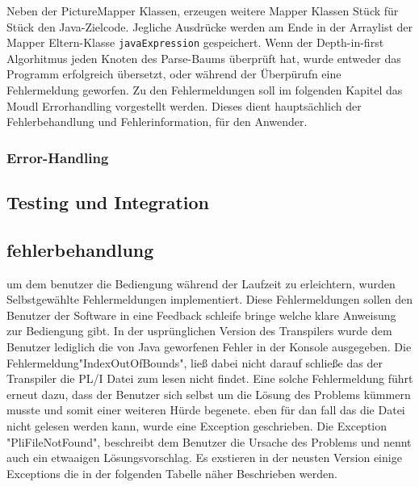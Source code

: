 Neben der PictureMapper Klassen, erzeugen weitere Mapper Klassen Stück für Stück den Java-Zielcode. 
Jegliche Ausdrücke werden am Ende in der Arraylist der Mapper Eltern-Klasse \verb+javaExpression+ gespeichert.
Wenn der Depth-in-first Algorhitmus jeden Knoten des Parse-Baums überprüft hat, wurde entweder das Programm erfolgreich übersetzt, oder während der Überpürufn 
eine Fehlermeldung geworfen.
Zu den Fehlermeldungen soll im folgenden Kapitel das Moudl Errorhandling vorgestellt werden.
Dieses dient hauptsächlich der Fehlerbehandlung und Fehlerinformation, für den Anwender.

\subsubsection{Error-Handling}

\subsection{Testing und Integration}




\subsection{fehlerbehandlung}
um dem benutzer die Bediengung während der Laufzeit zu erleichtern, wurden Selbstgewählte Fehlermeldungen implementiert. Diese Fehlermeldungen sollen den Benutzer der Software in eine Feedback schleife bringe welche klare Anweisung zur Bediengung gibt. In der usprünglichen Version des Transpilers wurde dem Benutzer lediglich die von Java geworfenen Fehler in der Konsole ausgegeben. Die Fehlermeldung"IndexOutOfBounds", ließ dabei nicht darauf schließe das der Transpiler die PL/I Datei zum lesen nicht findet. Eine solche Fehlermeldung führt erneut dazu, dass der Benutzer sich selbst um die Lösung des Problems kümmern musste und somit einer weiteren Hürde begenete.
eben für dan fall das die Datei nicht gelesen werden kann, wurde eine Exception geschrieben. Die Exception "PliFileNotFound", beschreibt dem Benutzer die Ursache des Problems und nennt auch ein etwaaigen Lösungsvorschlag. Es exstieren in der neusten Version einige Exceptions die in der folgenden Tabelle näher Beschrieben werden.

